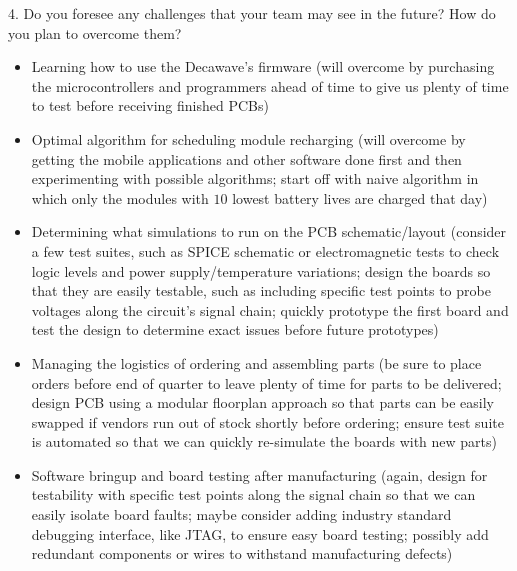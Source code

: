 \documentclass{article}
\begin{document}
4. Do you foresee any challenges that your team may see in the future? How do you plan to overcome them?
\begin{itemize}
\item Learning how to use the Decawave's firmware (will overcome by purchasing the microcontrollers and programmers ahead of time to give us plenty of time to test before receiving finished PCBs)
\item Optimal algorithm for scheduling module recharging (will overcome by getting the mobile applications and other software done first and then experimenting with possible algorithms; start off with naive algorithm in which only the modules with $10$ lowest battery lives are charged that day)
\item Determining what simulations to run on the PCB schematic/layout (consider a few test suites, such as SPICE schematic or electromagnetic tests to check logic levels and power supply/temperature variations; design the boards so that they are easily testable, such as including specific test points to probe voltages along the circuit's signal chain; quickly prototype the first board and test the design to determine exact issues before future prototypes)
\item Managing the logistics of ordering and assembling parts (be sure to place orders before end of quarter to leave plenty of time for parts to be delivered; design PCB using a modular floorplan approach so that parts can be easily swapped if vendors run out of stock shortly before ordering; ensure test suite is automated so that we can quickly re-simulate the boards with new parts)
\item Software bringup and board testing after manufacturing (again, design for testability with specific test points along the signal chain so that we can easily isolate board faults; maybe consider adding industry standard debugging interface, like JTAG, to ensure easy board testing; possibly add redundant components or wires to withstand manufacturing defects)
\end{itemize}
\end{document}
